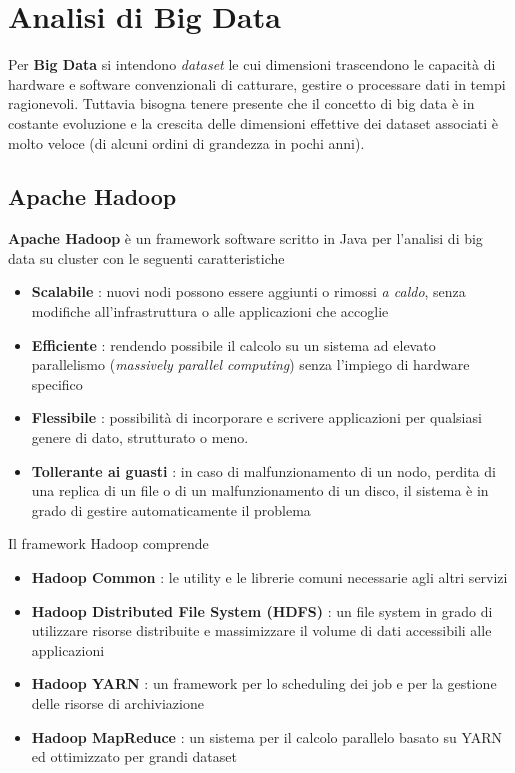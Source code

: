 \documentclass[italian,]{article}
\providecommand{\tightlist}{%
  \setlength{\itemsep}{0pt}\setlength{\parskip}{0pt}}
\begin{document}
\section{Analisi di Big Data}\label{analisi-di-big-data}

Per \textbf{Big Data} si intendono \emph{dataset} le cui dimensioni
trascendono le capacità di hardware e software convenzionali di
catturare, gestire o processare dati in tempi ragionevoli. Tuttavia
bisogna tenere presente che il concetto di big data è in costante
evoluzione e la crescita delle dimensioni effettive dei dataset
associati è molto veloce (di alcuni ordini di grandezza in pochi anni).

\subsection{Apache Hadoop}\label{apache-hadoop}

\textbf{Apache Hadoop} è un framework software scritto in Java per
l'analisi di big data su cluster con le seguenti caratteristiche

\begin{itemize}
\tightlist
\item
  \textbf{Scalabile} : nuovi nodi possono essere aggiunti o rimossi
  \emph{a caldo}, senza modifiche all'infrastruttura o alle applicazioni
  che accoglie
\item
  \textbf{Efficiente} : rendendo possibile il calcolo su un sistema ad
  elevato parallelismo (\emph{massively parallel computing}) senza
  l'impiego di hardware specifico
\item
  \textbf{Flessibile} : possibilità di incorporare e scrivere
  applicazioni per qualsiasi genere di dato, strutturato o meno.
\item
  \textbf{Tollerante ai guasti} : in caso di malfunzionamento di un
  nodo, perdita di una replica di un file o di un malfunzionamento di un
  disco, il sistema è in grado di gestire automaticamente il problema
\end{itemize}

Il framework Hadoop comprende

\begin{itemize}
\tightlist
\item
  \textbf{Hadoop Common} : le utility e le librerie comuni necessarie
  agli altri servizi
\item
  \textbf{Hadoop Distributed File System (HDFS)} : un file system in
  grado di utilizzare risorse distribuite e massimizzare il volume di
  dati accessibili alle applicazioni
\item
  \textbf{Hadoop YARN} : un framework per lo scheduling dei job e per la
  gestione delle risorse di archiviazione
\item
  \textbf{Hadoop MapReduce} : un sistema per il calcolo parallelo basato
  su YARN ed ottimizzato per grandi dataset
\end{itemize}
\end{document}
